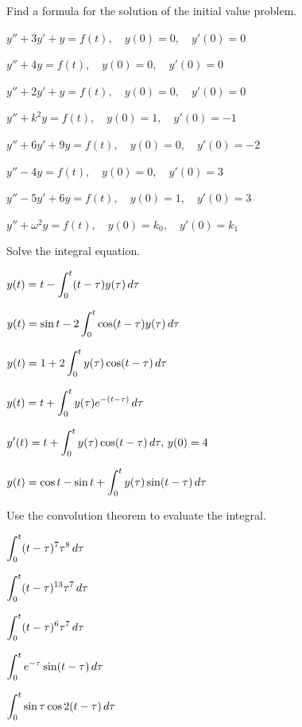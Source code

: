 \begin{exerciselist}
\item\label{exer:8.6.3}Find a formula for the solution of the initial value problem.

\begin{alist}
\item $y''+3y'+y=f(t),\quad y(0)=0,\quad y'(0)=0$
\item $y''+4y=f(t),\quad y(0)=0,\quad y'(0)=0$
\item $y''+2y'+y=f(t),\quad y(0)=0,\quad y'(0)=0$
\item $y''+k^2y=f(t),\quad y(0)=1,\quad y'(0)=-1$
\item $y''+6y'+9y=f(t),\quad y(0)=0,\quad y'(0)=-2$
\item $y''-4y=f(t),\quad y(0)=0,\quad y'(0)=3$
\item $y''-5y'+6y=f(t),\quad y(0)=1,\quad y'(0)=3$
\item $y''+\omega^2y=f(t),\quad y(0)=k_0,\quad y'(0)=k_1$
\end{alist}

\item\label{exer:8.6.4}Solve the integral equation.

\begin{alist}
\item $\displaystyle{y(t)=t-\int_0^t (t-\tau) y(\tau)\,d\tau}$
\item $\displaystyle{y(t)=\sin t-2\int_0^t\cos (t-\tau) y (\tau)\,d\tau}$
\item $\displaystyle{y(t)=1+2\int_0^ty(\tau)\cos(t-\tau)\,d\tau}$
\item $\displaystyle{y(t)=t+\int_0^t y(\tau)e^{-(t-\tau)}\,d\tau}$
\item $\displaystyle{y'(t)=t+\int_0^t y(\tau)\cos(t-\tau)\,d\tau,\, y(0)=4}$
\item $\displaystyle{y(t)=\cos t-\sin t+\int_0^t y(\tau)\sin (t-\tau)\,d\tau}$
\end{alist}

\item\label{exer:8.6.5}Use the convolution theorem to evaluate the integral.

\begin{alist*}[columns=2]
\item $\displaystyle{\int_0^t (t-\tau)^7\tau^8\,d\tau}$
\item $\displaystyle{\int_0^t(t-\tau)^{13}\tau^7\,d\tau}$
\item $\displaystyle{\int_0^t(t-\tau)^6\tau^7\,d\tau}$
\item $\displaystyle{\int_0^te^{-\tau}\sin(t-\tau)\,d\tau}$
\item $\displaystyle{\int_0^t\sin\tau\cos2(t-\tau)\,d\tau}$
\end{alist*}



\end{exerciselist}
